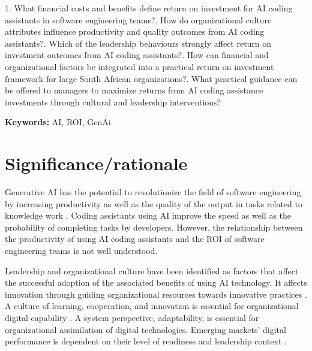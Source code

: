 \documentclass[11pt]{report}
\newenvironment{keyword}{\par\noindent\textbf{Keywords:} }{\par}
\begin{document}
1. What financial costs and benefits define return on investment for AI coding assistants in software engineering teams?. How do organizational culture attributes influence productivity and quality outcomes from AI coding assistants?. Which of the leadership behaviours strongly affect return on investment outcomes from AI coding assistants?. How can financial and organizational factors be integrated into a practical return on investment framework for large South African organizations?. What practical guidance can be offered to managers to maximize returns from AI coding assistance investments through cultural and leadership interventions?

\begin{keyword}
AI, ROI, GenAi.
\end{keyword}

\chapter*{Significance/rationale}

Generative AI has the potential to revolutionize the field of software engineering by increasing productivity as well as the quality of the output in tasks related to knowledge work \autocite{Brynjolfsson2025, Peng2023}. Coding assistants using AI improve the speed as well as the probability of completing tasks by developers. However, the relationship between the productivity of using AI coding assistants and the ROI of software engineering teams is not well understood.

Leadership and organizational culture have been identified as factors that affect the successful adoption of the associated benefits of using AI technology. It affects innovation through guiding organizational resources towards innovative practices \autocite{Hossain2025}. A culture of learning, cooperation, and innovation is essential for organizational digital capability \autocite{AbdulWahab2024, Li2025, Poisat2024}. A system perspective, adaptability, is essential for organizational assimilation of digital technologies. Emerging markets' digital performance is dependent on their level of readiness and leadership context \autocite{Gillespie2025, Nurlia2023}. 
\end{document}

